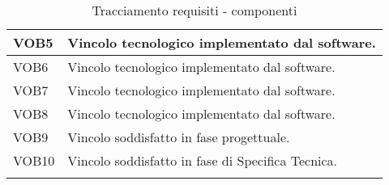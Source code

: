 {{\begin{longtable}{p{} p{}}
VOB5		& 	{Vincolo tecnologico implementato dal software.}\\
\midrule
VOB6		& 	{Vincolo tecnologico implementato dal software.}\\
\midrule
VOB7		& 	{Vincolo tecnologico implementato dal software.}\\
\midrule
VOB8		& 	{Vincolo tecnologico implementato dal software.}\\
\midrule
VOB9		& 	{Vincolo soddisfatto in fase progettuale.}\\
\midrule
VOB10		& 	{Vincolo soddisfatto in fase di Specifica Tecnica.}\\
\bottomrule
\caption{Tracciamento requisiti - componenti}
\label{tab:trc}
\end{longtable}
}


} %
